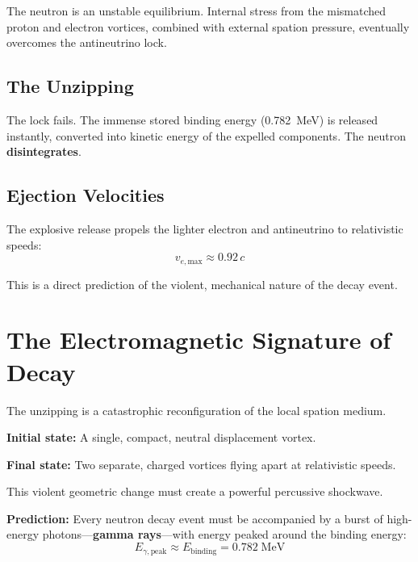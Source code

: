 The neutron is an unstable equilibrium.  Internal stress from the mismatched proton and electron vortices, combined with external spation pressure, eventually overcomes the antineutrino lock.

\subsection{The Unzipping}

The lock fails.  The immense stored binding energy (0.782~MeV) is released instantly, converted into kinetic energy of the expelled components.  The neutron \textbf{disintegrates}.

\subsection{Ejection Velocities}

The explosive release propels the lighter electron and antineutrino to relativistic speeds:
\begin{equation}\label{eq:v-electron}
  v_{e,\text{max}} \approx 0.92\,c
\end{equation}

This is a direct prediction of the violent, mechanical nature of the decay event.


\section{The Electromagnetic Signature of Decay}

The unzipping is a catastrophic reconfiguration of the local spation medium.

\textbf{Initial state:} A single, compact, neutral displacement vortex.

\textbf{Final state:} Two separate, charged vortices flying apart at relativistic speeds.

This violent geometric change must create a powerful percussive shockwave.

\textbf{Prediction:} Every neutron decay event must be accompanied by a burst of high-energy photons---\textbf{gamma rays}---with energy peaked around the binding energy:
\begin{equation}\label{eq:gamma}
  E_{\gamma,\text{peak}} \approx E_{\text{binding}} = 0.782\;\text{MeV}
\end{equation}

